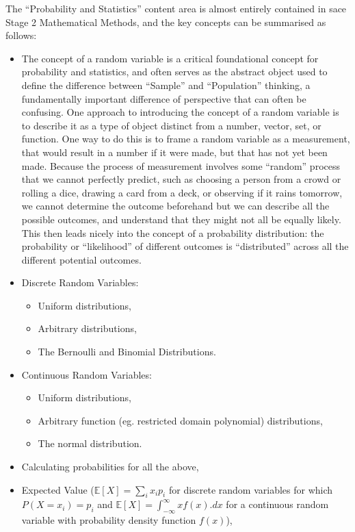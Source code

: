 \documentclass[twoside,12pt,a4paper]{report}
\begin{document}
The ``Probability and Statistics'' content area is almost entirely contained in \gls{sace} Stage 2 Mathematical Methods, and the key concepts can be summarised as follows:
\begin{itemize}
	\item The concept of a random variable is a critical foundational concept for probability and statistics, and often serves as the abstract object used to define the difference between ``Sample'' and ``Population'' thinking, a fundamentally important difference of perspective that can often be confusing. One approach to introducing the concept of a random variable is to describe it as a type of object distinct from a number, vector, set, or function. One way to do this is to frame a random variable as a measurement, that would result in a number if it were made, but that has not yet been made. Because the process of measurement involves some ``random'' process that we cannot perfectly predict, such as choosing a person from a crowd or rolling a dice, drawing a card from a deck, or observing if it rains tomorrow, we cannot determine the outcome beforehand but we can describe all the possible outcomes, and understand that they might not all be equally likely. This then leads nicely into the concept of a probability distribution: the probability or ``likelihood'' of different outcomes is ``distributed'' across all the different potential outcomes.
	\item Discrete Random Variables: 
		\begin{itemize}
			\item Uniform distributions,
			\item Arbitrary distributions,
			\item The Bernoulli and Binomial Distributions.
		\end{itemize}
	\item Continuous Random Variables:
		\begin{itemize}
			\item Uniform distributions,
			\item Arbitrary function (eg. restricted domain polynomial) distributions,
			\item The normal distribution.
		\end{itemize}
	\item Calculating probabilities for all the above,
	\item Expected Value ($\mathbb{E}[X] = \sum_i{x_ip_i}$ for discrete random variables for which $P(X = x_i) = p_i$ and $\mathbb{E}[X] = \int_{-\infty}^\infty{xf(x).dx}$ for a continuous random variable with probability density function $f(x)$), 

\end{itemize}
\end{document}
